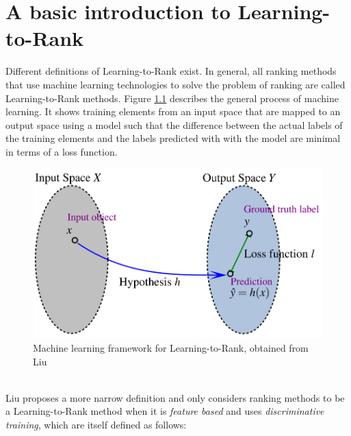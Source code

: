 \chapter{A basic introduction to Learning-to-Rank}
Different definitions of Learning-to-Rank exist. In general, all ranking methods that use machine learning technologies to solve the problem of ranking are called Learning-to-Rank methods. Figure \ref{fig:discriminative_training} describes the general process of machine learning. It shows training elements from an input space that are mapped to an output space using a model such that the difference between the actual labels of the training elements and the labels predicted with with the model are minimal in terms of a loss function.
\begin{figure}[!h]
\includegraphics[scale=0.26]{gfx/descriminative_training}
\caption{Machine learning framework for Learning-to-Rank, obtained from Liu\cite{Liu2007}}
\label{fig:discriminative_training}
\end{figure}\\
Liu \cite{Liu2007} proposes a more narrow definition and only considers ranking methods to be a Learning-to-Rank method when it is \emph{feature based} and uses \emph{discriminative training}, which are itself defined as follows:
